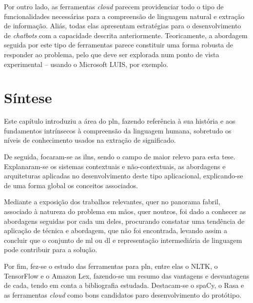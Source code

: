 Por outro lado, as ferramentas \textit{cloud} parecem providenciar todo o tipo de funcionalidades necessárias para a compreensão de linguagem natural e extração de informação. Aliás, todas elas apresentam estratégias para o desenvolvimento de \textit{chatbots} com a capacidade descrita anteriormente. Teoricamente, a abordagem seguida por este tipo de ferramentas parece constituir uma forma robusta de responder ao problema, pelo que deve ser explorada num ponto de vista experimental -- usando o Microsoft LUIS, por exemplo.



\section{Síntese}
\label{sec:chap03_chaptersummary}
Este capítulo introduziu a área do \gls{pln}, fazendo referência à sua história e aos fundamentos intrínsecos à compreensão da linguagem humana, sobretudo os níveis de conhecimento usados na extração de significado. 

De seguida, focaram-se as \glspl{iln}, sendo o campo de maior relevo para esta tese. Explanaram-se os sistemas contextuais e não-contextuais, as abordagens e arquiteturas aplicadas no desenvolvimento deste tipo aplicacional, explicando-se de uma forma global os conceitos associados.

Mediante a exposição dos trabalhos relevantes, quer no panorama fabril, associado à natureza do problema em mãos, quer noutros, foi dado a conhecer as abordagens seguidas por cada um deles, procurando constatar uma tendência de aplicação de técnica e abordagem, que não foi encontrada, levando assim a concluir que o conjunto de \gls{ml} ou \gls{dl} e representação intermediária de linguagem pode contribuir para a solução.

Por fim, fez-se o estudo das ferramentas para \gls{pln}, entre elas o NLTK, o TensorFlow e o Amazon Lex, fazendo-se um resumo das vantagens e desvantagens de cada, tendo em conta a bibliografia estudada. Destacam-se o spaCy, o Rasa e as ferramentas \textit{cloud} como bons candidatos paro desenvolvimento do protótipo.

